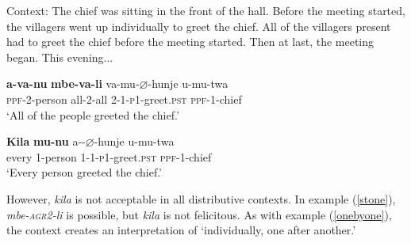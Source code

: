 \documentclass[letterpaper, 12pt]{article}
\let\emptyset\varnothing
\begin{document}
\begin{exe}

\ex Context: The chief was sitting in the front of the hall.  Before the meeting started, the villagers went up individually to greet the chief. All of the villagers present had to greet the chief before the meeting started. Then at last, the meeting began. This evening... \label{didgreet}

\begin{xlist}

\ex \gll \textbf{a-va-nu} \textbf{mbe-va-li} va-mu-$\emptyset$-hunje u-mu-twa \\
\textsc{ppf}-2-person all-2-all 2-1-\textsc{p1}-greet.\textsc{pst} \textsc{ppf}-1-chief \\
`All of the people greeted the chief.' \\

\vspace{5mm}

\ex \gll \textbf{Kila} \textbf{mu-nu} a--$\emptyset$-hunje u-mu-twa \\
every 1-person 1-1-\textsc{p1}-greet.\textsc{pst} \textsc{ppf}-1-chief  \\ \label{everygreeted}
`Every person greeted the chief.' 

\end{xlist}
\end{exe}


However, \textit{kila} is not acceptable in all distributive contexts. In example (\ref{stone}), \textit{mbe-\textsc{agr2}-li} is possible, but \textit{kila} is not felicitous. As with example (\ref{onebyone}), the context creates an interpretation of `individually, one after another.'  
\end{document}
